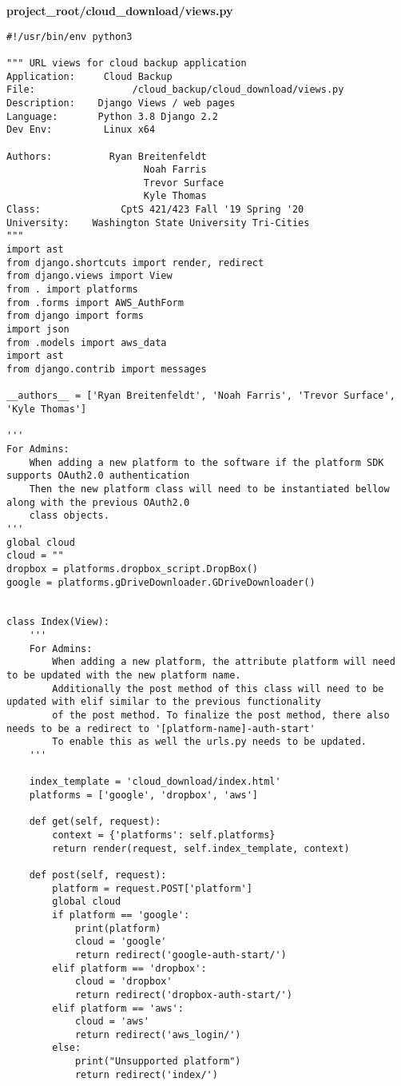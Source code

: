 \documentclass{article}
\begin{document}
\newpage
\textbf{project\_root/cloud\_download/views.py}
\begin{verbatim}
#!/usr/bin/env python3

""" URL views for cloud backup application
Application:     Cloud Backup
File:                 /cloud_backup/cloud_download/views.py
Description:    Django Views / web pages
Language:       Python 3.8 Django 2.2
Dev Env:         Linux x64

Authors:          Ryan Breitenfeldt
                        Noah Farris
                        Trevor Surface
                        Kyle Thomas
Class:              CptS 421/423 Fall '19 Spring '20
University:    Washington State University Tri-Cities
"""
import ast
from django.shortcuts import render, redirect
from django.views import View
from . import platforms
from .forms import AWS_AuthForm
from django import forms
import json
from .models import aws_data
import ast
from django.contrib import messages

__authors__ = ['Ryan Breitenfeldt', 'Noah Farris', 'Trevor Surface', 'Kyle Thomas']

'''
For Admins:
    When adding a new platform to the software if the platform SDK supports OAuth2.0 authentication
    Then the new platform class will need to be instantiated bellow along with the previous OAuth2.0 
    class objects.  
'''
global cloud 
cloud = ""
dropbox = platforms.dropbox_script.DropBox()
google = platforms.gDriveDownloader.GDriveDownloader()


class Index(View):
    '''
    For Admins:
        When adding a new platform, the attribute platform will need to be updated with the new platform name.
        Additionally the post method of this class will need to be updated with elif similar to the previous functionality
        of the post method. To finalize the post method, there also needs to be a redirect to '[platform-name]-auth-start'
        To enable this as well the urls.py needs to be updated. 
    '''

    index_template = 'cloud_download/index.html'
    platforms = ['google', 'dropbox', 'aws']

    def get(self, request):
        context = {'platforms': self.platforms}
        return render(request, self.index_template, context)

    def post(self, request):
        platform = request.POST['platform']
        global cloud
        if platform == 'google':
            print(platform)  
            cloud = 'google'
            return redirect('google-auth-start/')
        elif platform == 'dropbox': 
            cloud = 'dropbox' 
            return redirect('dropbox-auth-start/')
        elif platform == 'aws':
            cloud = 'aws'
            return redirect('aws_login/')
        else:
            print("Unsupported platform")
            return redirect('index/')


\end{verbatim}
\end{document}
